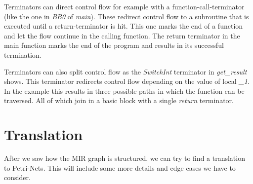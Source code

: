 Terminators can direct control flow for example with a function-call-terminator (like the one in \textit{BB0} of \textit{main}).
These redirect control flow to a subroutine that is executed until a return-terminator is hit.
This one marks the end of a function and let the flow continue in the calling function.
The return terminator in the main function marks the end of the program and results in its successful termination.

Terminators can also split control flow as the \textit{SwitchInt} terminator in \textit{get\_result} shows.
This terminator redirects control flow depending on the value of local \textit{\_1}.
In the example this results in three possible paths in which the function can be traversed.
All of which join in a basic block with a single \textit{return} terminator.

\section{Translation}
\label{app_trans}
After we saw how the MIR graph is structured, we can try to find a translation to Petri-Nets. This will include some more details and edge cases we have to consider.

